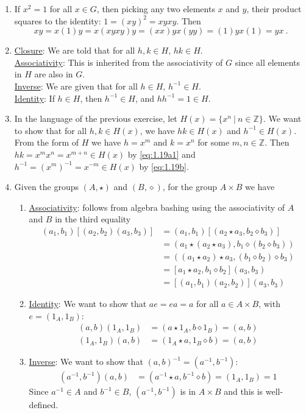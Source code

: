 \documentclass[]{article}
\newcommand{\bbz}{\mathbb{Z}}
\begin{document}
\begin{enumerate}
\item If $x^2 = 1$ for all $x\in G$, then picking any two elements $x$ and $y$, their product squares to the identity: $1 = (xy)^2 = xyxy$. Then
\begin{equation}
xy = x(1)y = x(xyxy)y = (xx)yx(yy) = (1)yx(1) = yx\ .
\end{equation}


\item \underline{Closure}: We are told that for all $h,k \in H$, $hk \in H$. \\
\underline{Associativity}: This is inherited from the associativity of $G$ since all elements in $H$ are also in $G$. \\
\underline{Inverse}: We are given that for all $h \in H$, $h^{-1} \in H$. \\
\underline{Identity}: If $h \in H$, then $h^{-1} \in H$, and $hh^{-1} = 1 \in H$.


\item In the language of the previous exercise, let $H(x) = \{ x^n \ \vert\ n \in \bbz \}$. We want to show that for all $h,k \in H(x)$, we have $hk \in H(x)$ and $h^{-1} \in H(x)$. From the form of $H$ we have $h = x^m$ and $k = x^n$ for some $m,n\in \bbz$. Then $hk = x^mx^n = x^{m+n} \in H(x)$ by \eqref{eq:1.19a1} and $h^{-1} = \left(x^m\right)^{-1} = x^{-m} \in H(x)$ by \eqref{eq:1.19b}.


\item Given the groups $(A,\star)$ and $(B,\diamond)$, for the group $A\times B$ we have\begin{enumerate}
\item \underline{Associativity}: follows from algebra bashing using the associativity of $A$ and $B$ in the third equality\begin{align}
(a_1,b_1) \left[ (a_2,b_2) (a_3,b_3) \right] &= (a_1,b_1)\left[(a_2\star a_3, b_2\diamond b_3)\right] \\
&= (a_1\star(a_2\star a_3),b_1\diamond (b_2\diamond b_3)) \\
&= ((a_1\star a_2)\star a_3,(b_1\diamond b_2)\diamond b_3) \\
&= \left[a_1\star a_2,b_1\diamond b_2\right](a_3,b_3) \\
&= \left[(a_1,b_1)(a_2,b_2)\right](a_3,b_3)
\end{align}
\item \underline{Identity}: We want to show that $ae = ea = a$ for all $a \in A\times B$, with $e = (1_A,1_B)$:
\begin{align}
(a,b)(1_A,1_B) &= (a\star 1_A, b\diamond 1_B) = (a,b) \\
(1_A,1_B)(a,b) &= (1_A\star a, 1_B\diamond b) = (a,b) 
\end{align}
\item \underline{Inverse}: We want to show that $(a,b)^{-1} = (a^{-1},b^{-1})$:
\begin{align}
(a^{-1},b^{-1})(a,b) &= (a^{-1}\star a, b^{-1}\diamond b) = (1_A, 1_B) = 1
\end{align}
Since $a^{-1} \in A$ and $b^{-1} \in B$, $(a^{-1},b^{-1})$ is in $A\times B$ and this is well-defined.
\end{enumerate}



\end{enumerate}
\end{document}
